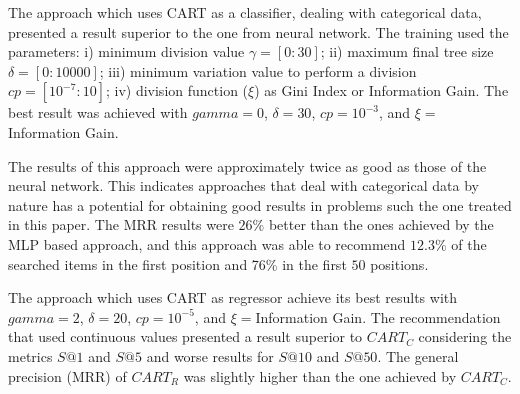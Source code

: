 \documentclass{doublecol-new}
\theoremstyle{TH}{
\newtheorem{lemma}{Lemma}
\newtheorem{theorem}[lemma]{Theorem}
\newtheorem{corrolary}[lemma]{Corrolary}
\newtheorem{conjecture}[lemma]{Conjecture}
\newtheorem{proposition}[lemma]{Proposition}
\newtheorem{claim}[lemma]{Claim}
\newtheorem{stheorem}[lemma]{Wrong Theorem}
\newtheorem{algorithm}{Algorithm}
}
\theoremstyle{THrm}{
\newtheorem{definition}{Definition}[section]
\newtheorem{question}{Question}[section]
\newtheorem{remark}{Remark}
\newtheorem{scheme}{Scheme}
}
\theoremstyle{THhit}{
\newtheorem{case}{Case}[section]
}
\begin{document}
The approach which uses CART as a classifier, dealing with categorical data, presented a result superior to the one from neural network. The training used the parameters: i) minimum division value \(\gamma = [0:30]\); ii) maximum final tree size \(\delta = [0:10000]\); iii) minimum variation value to perform a division \(cp = [10^{-7}:10]\); iv) division function (\(\xi\)) as Gini Index or Information Gain. The best result was achieved with \(gamma = 0\), \(\delta = 30\), \(cp = 10^{-3} \), and \(\xi = \) Information Gain.

The results of this approach were approximately twice as good as those of the neural network. This indicates approaches that deal with categorical data by nature has a potential for obtaining good results in problems such the one treated in this paper. The MRR results were \(26\%\) better than the ones achieved by the MLP based approach, and this approach was able to recommend \(12.3\%\) of the searched items in the first position and 76\% in the first \(50\) positions.

The approach which uses CART as regressor achieve its best results with \(gamma = 2\), \(\delta = 20\), \(cp = 10^{-5}\), and \(\xi = \)Information Gain. The recommendation that used continuous values ​​presented a result superior to \(CART_C\) considering the metrics \(S@1\) and \(S@5\) and worse results for \(S@10\) and \(S@50\). The general precision (MRR) of \(CART_R\) was slightly higher than the one achieved by \(CART_C\).
\end{document}
